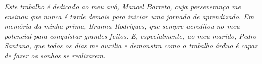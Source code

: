 \begin{dedicatoria}
   \vspace*{\fill}
   \centering
   \noindent
    \textit{Este trabalho é dedicado ao meu avô, Manoel Barreto, cuja perseverança me ensinou que nunca é tarde demais para iniciar uma jornada de aprendizado. Em memória da minha prima, Brunna Rodrigues, que sempre acreditou no meu potencial para conquistar grandes feitos. E, especialmente, ao meu marido, Pedro Santana, que todos os dias me auxilia e demonstra como o trabalho árduo é capaz de fazer os sonhos se realizarem.} \vspace*{\fill}


\end{dedicatoria}

